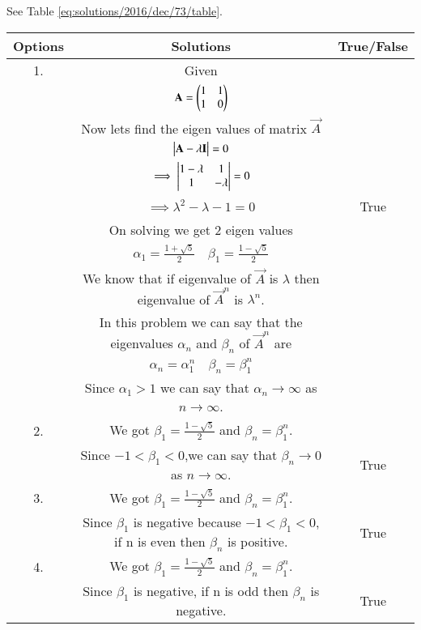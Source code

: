 See Table \ref{eq:solutions/2016/dec/73/table}.

\begin{table*}[ht!]
\centering
\begin{tabular}{|c|c|c|}
\hline
\textbf{Options} & \textbf{Solutions} & \textbf{True/False}\\
\hline
1.& Given&\\&$\mathbf{A}=\begin{pmatrix}1 & 1\\1 & 0\end{pmatrix}$&\\&Now lets find the eigen values of matrix $\vec{A}$&\\&$
    \begin{vmatrix}\mathbf{A}-\lambda\mathbf{I}\end{vmatrix}=0$&\\&
    $\implies \begin{vmatrix}1-\lambda & 1\\1 & -\lambda\end{vmatrix}=0$&\\
    &$\implies \lambda^2-\lambda-1=0$&True\\&On solving we get 2 eigen values&\\& $\alpha_1=\frac{1+\sqrt{5}}{2}\quad\beta_1=\frac{1-\sqrt{5}}{2}$&\\&We know that if eigenvalue of $\vec{A}$ is $\lambda$ then eigenvalue of $\vec{A}^n$ is $\lambda^n$.&\\&In this problem we can say that the eigenvalues $\alpha_n$ and $\beta_n$ of $\vec{A}^n$ are&\\&$\alpha_n=\alpha_1^n\quad\beta_n=\beta_1^n$&\\&Since $\alpha_1>1$ we can say that $\alpha_n\rightarrow \infty$ as $n\rightarrow \infty$.&\\
\hline
2.& We got $\beta_1=\frac{1-\sqrt{5}}{2}$ and $\beta_n=\beta_1^n$. &\\&Since $-1<\beta_1<0$,we can say that $\beta_n\rightarrow 0$ as $n\rightarrow \infty$.&True\\
\hline
3.&We got $\beta_1=\frac{1-\sqrt{5}}{2}$ and $\beta_n=\beta_1^n$.&\\&Since $\beta_1$ is negative because $-1<\beta_1<0$, if n is even then $\beta_n$ is positive.&True\\
\hline
4.&We got $\beta_1=\frac{1-\sqrt{5}}{2}$ and $\beta_n=\beta_1^n$.&\\&Since $\beta_1$ is negative, if n is odd then $\beta_n$ is negative.&True\\
\hline
\end{tabular}
\caption{}
\label{eq:solutions/2016/dec/73/table}
\end{table*}

